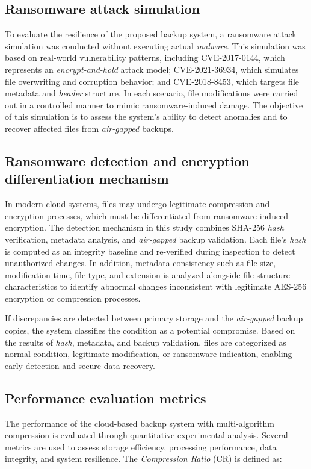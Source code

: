 \documentclass{iaesarticle}
\begin{document}
\subsection{Ransomware attack simulation}
To evaluate the resilience of the proposed backup system, a ransomware attack simulation was conducted without executing actual \textit{malware}. This simulation was based on real-world vulnerability patterns, including CVE-2017-0144, which represents an \textit{encrypt-and-hold} attack model; CVE-2021-36934, which simulates file overwriting and corruption behavior; and CVE-2018-8453, which targets file metadata and \textit{header} structure. In each scenario, file modifications were carried out in a controlled manner to mimic ransomware-induced damage. The objective of this simulation is to assess the system's ability to detect anomalies and to recover affected files from \textit{air-gapped} backups.

\subsection{Ransomware detection and encryption differentiation mechanism}
In modern cloud systems, files may undergo legitimate compression and encryption processes, which must be differentiated from ransomware-induced encryption. The detection mechanism in this study combines SHA-256 \textit{hash} verification, metadata analysis, and \textit{air-gapped} backup validation. Each file's \textit{hash} is computed as an integrity baseline and re-verified during inspection to detect unauthorized changes. In addition, metadata consistency such as file size, modification time, file type, and extension is analyzed alongside file structure characteristics to identify abnormal changes inconsistent with legitimate AES-256 encryption or compression processes.

If discrepancies are detected between primary storage and the \textit{air-gapped} backup copies, the system classifies the condition as a potential compromise. Based on the results of \textit{hash}, metadata, and backup validation, files are categorized as normal condition, legitimate modification, or ransomware indication, enabling early detection and secure data recovery.

\subsection{Performance evaluation metrics}
The performance of the cloud-based backup system with multi-algorithm compression is evaluated through quantitative experimental analysis. Several metrics are used to assess storage efficiency, processing performance, data integrity, and system resilience. The \textit{Compression Ratio} (CR) is defined as:
\end{document}
